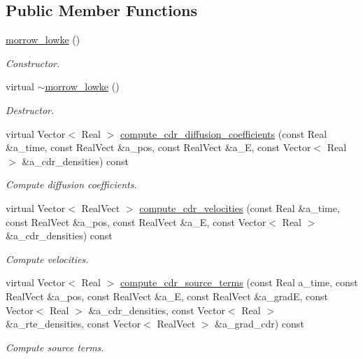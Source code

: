 \subsection*{Public Member Functions}
\begin{DoxyCompactItemize}
\item 
\hyperlink{classmorrow__lowke_ac5eb122414569024b2e188cb9f8a261b}{morrow\+\_\+lowke} ()
\begin{DoxyCompactList}\small\item\em Constructor. \end{DoxyCompactList}\item 
virtual \hyperlink{classmorrow__lowke_a8214a38d90f19bedaccfedaae0b6e29f}{$\sim$morrow\+\_\+lowke} ()
\begin{DoxyCompactList}\small\item\em Destructor. \end{DoxyCompactList}\item 
virtual Vector$<$ Real $>$ \hyperlink{classmorrow__lowke_ab971606b89e71bf3e067db670b5df9da}{compute\+\_\+cdr\+\_\+diffusion\+\_\+coefficients} (const Real \&a\+\_\+time, const Real\+Vect \&a\+\_\+pos, const Real\+Vect \&a\+\_\+E, const Vector$<$ Real $>$ \&a\+\_\+cdr\+\_\+densities) const 
\begin{DoxyCompactList}\small\item\em Compute diffusion coefficients. \end{DoxyCompactList}\item 
virtual Vector$<$ Real\+Vect $>$ \hyperlink{classmorrow__lowke_aef81e4371e22769f15508890f0c2c290}{compute\+\_\+cdr\+\_\+velocities} (const Real \&a\+\_\+time, const Real\+Vect \&a\+\_\+pos, const Real\+Vect \&a\+\_\+E, const Vector$<$ Real $>$ \&a\+\_\+cdr\+\_\+densities) const 
\begin{DoxyCompactList}\small\item\em Compute velocities. \end{DoxyCompactList}\item 
virtual Vector$<$ Real $>$ \hyperlink{classmorrow__lowke_a9ca9f2ebea3c3e7ebeff6d6704e6a230}{compute\+\_\+cdr\+\_\+source\+\_\+terms} (const Real a\+\_\+time, const Real\+Vect \&a\+\_\+pos, const Real\+Vect \&a\+\_\+E, const Real\+Vect \&a\+\_\+gradE, const Vector$<$ Real $>$ \&a\+\_\+cdr\+\_\+densities, const Vector$<$ Real $>$ \&a\+\_\+rte\+\_\+densities, const Vector$<$ Real\+Vect $>$ \&a\+\_\+grad\+\_\+cdr) const 
\begin{DoxyCompactList}\small\item\em Compute source terms. \end{DoxyCompactList}\item 

\end{DoxyCompactItemize}
